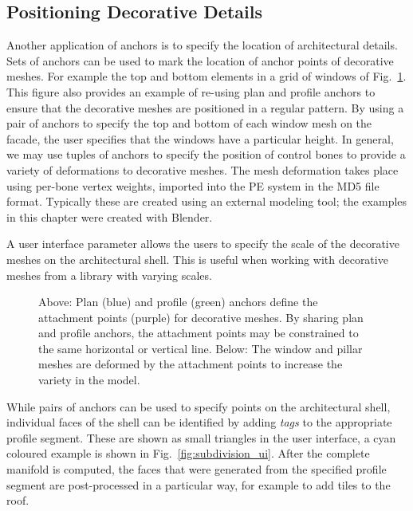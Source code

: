 \subsection{Positioning Decorative Details}

Another application of anchors is to specify the location of architectural details. Sets of anchors can be used to mark the location of anchor points of decorative meshes. For example the top and bottom elements in a grid of windows of Fig.~\ref{fig:windows_stretchy}. This figure also provides an example of re-using plan and profile anchors to ensure that the decorative meshes are positioned in a regular pattern. By using a pair of anchors to specify the top and bottom of each window mesh on the facade, the user specifies that the windows have a particular height. In general, we may use tuples of anchors to specify the position of control bones to provide a variety of deformations to decorative meshes. The mesh deformation takes place using per-bone vertex weights\cite{Lewis00}, imported into the PE system in the MD5 file format. Typically these are created using an external modeling tool; the examples in this chapter were created with Blender\cite{Blender}.

A user interface parameter allows the users to specify the scale of the decorative meshes on the architectural shell. This is useful when working with decorative meshes from a library with varying scales.

\begin{figure}
  \centering
 \def\svgwidth{0.5\columnwidth}
  
  \caption[Sharing anchors]{\label{fig:windows_stretchy}Above: Plan (blue) and profile (green) anchors define the attachment points (purple) for decorative meshes. By sharing plan and profile anchors, the attachment points may be constrained to the same horizontal or vertical line. Below: The window and pillar meshes are deformed by the attachment points to increase the variety in the model.}
\end{figure}

While pairs of anchors can be used to specify points on the architectural shell, individual faces of the shell can be identified by adding \emph{tags} to the appropriate profile segment. These are shown as small triangles in the user interface, a cyan coloured example is shown in Fig.~\ref{fig:subdivision_ui}. After the complete manifold is computed, the faces that were generated from the specified profile segment are post-processed in a particular way, for example to add tiles to the roof.

